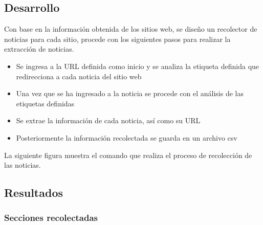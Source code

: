 \subsection{Desarrollo}

Con base en la información obtenida de los sitios web, se diseño un recolector de noticias para cada sitio, procede con 
los siguientes pasos para realizar la extracción de noticias.

\begin{itemize}
  \item Se ingresa a la URL definida como inicio y se analiza la etiqueta definida que redirecciona a cada noticia del sitio web
  \item Una vez que se ha ingresado a la noticia se procede con el análisis de las etiquetas definidas
  \item Se extrae la información de cada noticia, así como su URL
  \item Posteriormente la información recolectada se guarda en un archivo csv
\end{itemize}
La siguiente figura muestra el comando que realiza el proceso de recolección de las noticias.


\subsection{Resultados}

\subsubsection{Secciones recolectadas}

